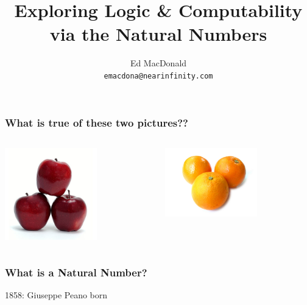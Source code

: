 \documentclass{beamer}
\title[Logic, Computability, $\mathds{N}$]{Exploring Logic \& Computability via the Natural Numbers}
\institute[NIC]{Near Infinity Corporation}
\author[Ed MacDonald]{Ed MacDonald \\ \texttt{emacdona@nearinfinity.com}}
\begin{document}
\begin{frame}
\titlepage
\end{frame}

\begin{frame}
   \frametitle{What is true of these two pictures??}
   \begin{columns}
      \begin{column}{5cm}
         \includegraphics[width=4cm,height=4cm]{images/apples.jpg}
      \end{column}
      \begin{column}{5cm}
         \includegraphics[width=4cm,height=3cm]{images/oranges.jpg}
      \end{column}
   \end{columns}
\end{frame}

\begin{frame}
   \frametitle{What is a Natural Number?}
   1858: Giuseppe Peano born\\
\end{frame}

\begin{frame}
\end{frame}
\end{document}
